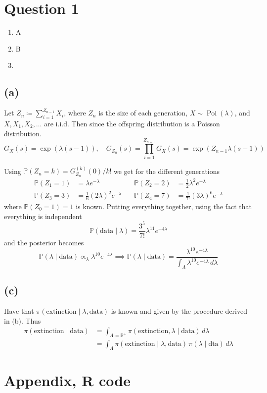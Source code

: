 \documentclass{article}
\DeclareMathOperator\Poisson{Poi}
\begin{document}
\section{Question 1}
\begin{enumerate}[label=(\alph*)]
\item A
\item B
\item
\end{enumerate}

\subsection{(a)}
Let $Z_n \coloneqq \sum_{i=1}^{Z_{n-1}} X_i$,
where $Z_n$ is the size of each generation,
$X \sim \Poisson(\lambda)$, and $X, X_1, X_2, \ldots$ are i.i.d.
Then since the offspring distribution is a Poisson distribution.
$$ G_X(s) = \exp(\lambda (s - 1)), \quad
G_{Z_n}(s) = \prod_{i=1}^{Z_{n-1}} G_X(s) = \exp(Z_{n-1} \lambda (s - 1)) $$

Using $ \mathbb P(Z_n = k) = G_{Z_n}^{(k)}(0) / k! $
we get for the different generations
\begin{align*}
	\mathbb P(Z_1 = 1) &= \lambda e^{-\lambda} &\quad
	\mathbb P(Z_2 = 2) &= \frac12 \lambda^2 e^{-\lambda} \\
	\mathbb P(Z_3 = 3) &= \frac16 (2\lambda)^2 e^{-\lambda} &\quad
	\mathbb P(Z_4 = 7) &= \frac1{7!} (3\lambda)^6 e^{-\lambda}
\end{align*}
where $\mathbb P(Z_0 = 1) = 1$ is known.
Putting everything together,
using the fact that everything is independent
$$ \mathbb P(\text{data} \mid \lambda) = \frac{3^5}{7!} \lambda^{11} e^{-4\lambda} $$
and the posterior becomes
$$ \mathbb P(\lambda \mid \text{data}) \propto_\lambda \lambda^10 e^{-4\lambda}
	\implies \mathbb P(\lambda \mid \text{data}) = \frac{\lambda^10 e^{-4\lambda}}{\int_\Lambda \lambda^10 e^{-4\lambda} \, d\lambda} $$

\subsection{(c)}
Have that $\pi(\text{extinction} \mid \lambda, \text{data})$ is known
and given by the procedure derived in (b).
Thus
\begin{align*}
\pi(\text{extinction} \mid \text{data}) &= \int_{\Lambda \coloneqq \mathbb R^+} \pi(\text{extinction}, \lambda \mid \text{data}) \, d\lambda \\
	&= \int_\Lambda \pi(\text{extinction} \mid \lambda, \text{data}) \, \pi(\lambda \mid \text{dta}) \, d\lambda
\end{align*}

\appendix
\section{Appendix, R code}
% 
\end{document}
